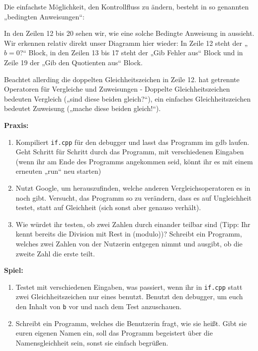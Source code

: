 Die einfachste Möglichkeit, den Kontrollfluss zu ändern, besteht in so
genannten „bedingten Anweisungen“:

In den Zeilen 12 bis 20 sehen wir, wie eine solche Bedingte Anweisung in \Cpp
aussieht. Wir erkennen relativ direkt unser Diagramm hier wieder: In Zeile 12
steht der „$b=0$?“ Block, in den Zeilen 13 bis 17 steht der „Gib Fehler aus“
Block und in Zeile 19 der „Gib den Quotienten aus“ Block.

Beachtet allerding die doppelten Gleichheitszeichen in Zeile 12. \Cpp hat
getrennte Operatoren für Vergleiche und Zuweisungen - Doppelte
Gleichheitszeichen bedeuten Vergleich („sind diese beiden gleich?“), ein
einfaches Gleichheitszeichen bedeutet Zuweisung („mache diese beiden gleich!“).

\textbf{Praxis:}
\begin{enumerate}
    \item Kompiliert \texttt{if.cpp} für den debugger und lasst das Programm im
        gdb laufen. Geht Schritt für Schritt durch das Programm, mit
        verschiedenen Eingaben (wenn ihr am Ende des Programms angekommen seid,
        könnt ihr es mit einem erneuten „run“ neu starten)
    \item Nutzt Google, um herauszufinden, welche anderen Vergleichsoperatoren
        es in \Cpp noch gibt. Versucht, das Programm so zu verändern, dass es
        auf Ungleichheit testet, statt auf Gleichheit (sich sonst aber genauso
        verhält).
	\item Wie würdet ihr testen, ob zwei Zahlen durch einander teilbar sind
		(Tipp: Ihr kennt bereits die Division mit Rest in \Cpp (modulo))?
		Schreibt ein Programm, welches zwei Zahlen von der Nutzerin entgegen
		nimmt und ausgibt, ob die zweite Zahl die erste teilt.
\end{enumerate}

\textbf{Spiel:}
\begin{enumerate}
    \item Testet mit verschiedenen Eingaben, was passiert, wenn ihr in
        \texttt{if.cpp} statt zwei Gleichheitszeichen nur eines benutzt.
        Benutzt den debugger, um euch den Inhalt von \texttt{b} vor und nach
        dem Test anzuschauen.
    \item Schreibt ein Programm, welches die Benutzerin fragt, wie sie heißt.
        Gibt sie euren eigenen Namen ein, soll das Programm begeistert über die
        Namensgleichheit sein, sonst sie einfach begrüßen.
\end{enumerate}
